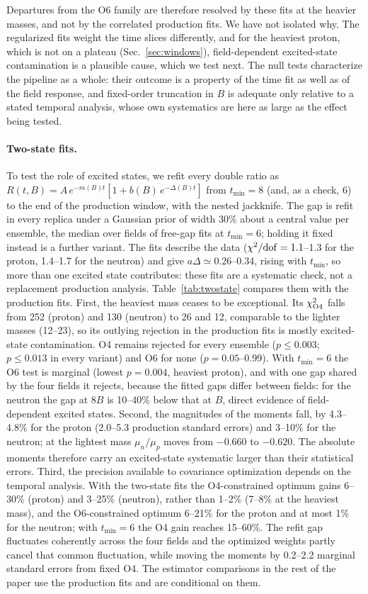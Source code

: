 \documentclass[aps,prd,preprint,nofootinbib,floatfix]{revtex4-2}
\begin{document}
Departures from the O6 family are therefore resolved by these fits at the heavier masses, and not by the correlated production fits. We have not isolated why. The regularized fits weight the time slices differently, and for the heaviest proton, which is not on a plateau (Sec.~\ref{sec:windows}), field-dependent excited-state contamination is a plausible cause, which we test next. The null tests characterize the pipeline as a whole: their outcome is a property of the time fit as well as of the field response, and fixed-order truncation in $B$ is adequate only relative to a stated temporal analysis, whose own systematics are here as large as the effect being tested.

\paragraph{Two-state fits.} To test the role of excited states, we refit every double ratio as $R(t,B)=A\,e^{-m(B)t}[1+b(B)\,e^{-\Delta(B)t}]$ from $t_{\min}=8$ (and, as a check, 6) to the end of the production window, with the nested jackknife. The gap is refit in every replica under a Gaussian prior of width 30\% about a central value per ensemble, the median over fields of free-gap fits at $t_{\min}=6$; holding it fixed instead is a further variant. The fits describe the data ($\chi^2/{\rm dof}=1.1$--1.3 for the proton, 1.4--1.7 for the neutron) and give $a\Delta\simeq0.26$--0.34, rising with $t_{\min}$, so more than one excited state contributes: these fits are a systematic check, not a replacement production analysis. Table~\ref{tab:twostate} compares them with the production fits. First, the heaviest mass ceases to be exceptional. Its $\chi^2_{\rm O4}$ falls from 252 (proton) and 130 (neutron) to 26 and 12, comparable to the lighter masses (12--23), so its outlying rejection in the production fits is mostly excited-state contamination. O4 remains rejected for every ensemble ($p\le0.003$; $p\le0.013$ in every variant) and O6 for none ($p=0.05$--0.99). With $t_{\min}=6$ the O6 test is marginal (lowest $p=0.004$, heaviest proton), and with one gap shared by the four fields it rejects, because the fitted gaps differ between fields: for the neutron the gap at $8B$ is 10--40\% below that at $B$, direct evidence of field-dependent excited states. Second, the magnitudes of the moments fall, by 4.3--4.8\% for the proton (2.0--5.3 production standard errors) and 3--10\% for the neutron; at the lightest mass $\mu_n/\mu_p$ moves from $-0.660$ to $-0.620$. The absolute moments therefore carry an excited-state systematic larger than their statistical errors. Third, the precision available to covariance optimization depends on the temporal analysis. With the two-state fits the O4-constrained optimum gains 6--30\% (proton) and 3--25\% (neutron), rather than 1--2\% (7--8\% at the heaviest mass), and the O6-constrained optimum 6--21\% for the proton and at most 1\% for the neutron; with $t_{\min}=6$ the O4 gain reaches 15--60\%. The refit gap fluctuates coherently across the four fields and the optimized weights partly cancel that common fluctuation, while moving the moments by 0.2--2.2 marginal standard errors from fixed O4. The estimator comparisons in the rest of the paper use the production fits and are conditional on them.
\end{document}
